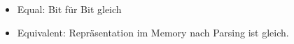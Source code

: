 \begin{itemize}
\item Equal: Bit für Bit gleich
\item Equivalent: Repräsentation im Memory nach Parsing ist gleich.
\end{itemize}

